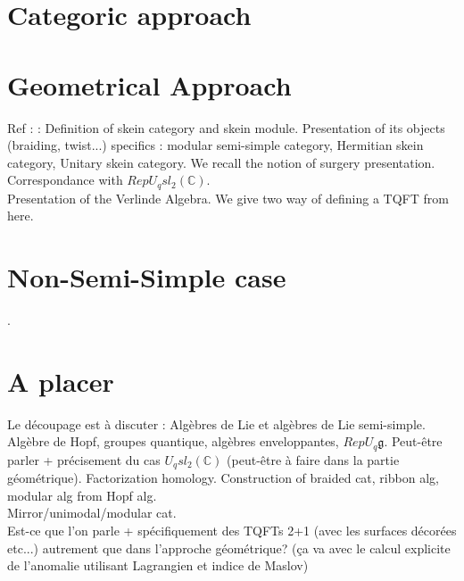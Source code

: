 \documentclass{article}
\begin{document}
\section{Categoric approach} 

\section{Geometrical Approach} Ref : \cite{Tur} \cite{BHMV} \cite{PS} : Definition of skein category and skein module. Presentation of its objects (braiding, twist...) specifics : modular semi-simple category, Hermitian skein category, Unitary skein category. We recall the notion of surgery presentation. Correspondance with $Rep U_q sl_2 (\mathbb{C})$.\\
Presentation of the Verlinde Algebra. We give two way of defining a TQFT from here.

\section{Non-Semi-Simple case}.
 
\section{A placer} Le découpage est à discuter : Algèbres de Lie et algèbres de Lie semi-simple. Algèbre de Hopf, groupes quantique, algèbres enveloppantes, $Rep U_q \mathfrak{g}$. Peut-être parler + précisement du cas $U_q sl_2 (\mathbb{C} )$ (peut-être à faire dans la partie géométrique). Factorization homology. Construction of braided cat, ribbon alg, modular alg from Hopf alg.\\
Mirror/unimodal/modular cat.\\
Est-ce que l'on parle + spécifiquement des TQFTs 2+1 (avec les surfaces décorées etc...) autrement que dans l'approche géométrique? (ça va avec le calcul explicite de l'anomalie utilisant Lagrangien et indice de Maslov)



\end{document}

